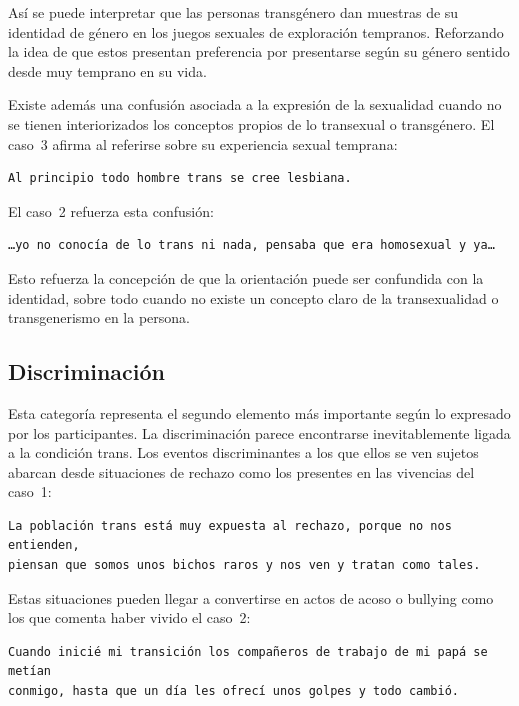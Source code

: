 Así se puede interpretar que las personas transgénero dan muestras de su
identidad de género en los juegos sexuales de exploración
tempranos. Reforzando la idea de que estos presentan preferencia por presentarse
según su género sentido desde muy temprano en su vida.

Existe además una confusión asociada a la expresión de la sexualidad cuando no
se tienen interiorizados los conceptos propios de lo transexual o transgénero.
El caso~3 afirma al referirse sobre su experiencia sexual temprana:

\begin{verbatim}
Al principio todo hombre trans se cree lesbiana.
\end{verbatim}

El caso~2 refuerza esta confusión:

\begin{verbatim}
…yo no conocía de lo trans ni nada, pensaba que era homosexual y ya…
\end{verbatim}

Esto refuerza la concepción de que la orientación puede ser confundida con la
identidad, sobre todo cuando no existe un concepto claro de la transexualidad o
transgenerismo en la persona.

\subsection{Discriminación}

Esta categoría representa el segundo elemento más importante según lo expresado
por los participantes. La discriminación parece encontrarse inevitablemente
ligada a la condición trans. Los eventos discriminantes a los que ellos se ven
sujetos abarcan desde situaciones de rechazo como los presentes en las vivencias del caso~1:

\begin{verbatim}
La población trans está muy expuesta al rechazo, porque no nos entienden,
piensan que somos unos bichos raros y nos ven y tratan como tales.
\end{verbatim}

Estas situaciones pueden llegar a convertirse en actos de acoso o bullying como
los que comenta haber vivido el caso~2:

\begin{verbatim}
Cuando inicié mi transición los compañeros de trabajo de mi papá se metían
conmigo, hasta que un día les ofrecí unos golpes y todo cambió.
\end{verbatim}

